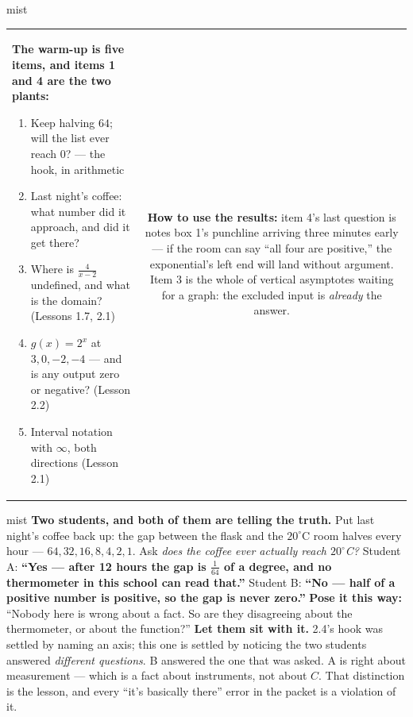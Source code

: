 \documentclass[10pt]{article}
\begin{document}
\begin{fixedskillbox}{mist}
\begin{tabularx}{\linewidth}{@{}X c@{}}
\begin{minipage}[t]{0.55\linewidth}\vspace{0pt}
\textbf{The warm-up is five items, and items 1 and 4 are the two plants:}
\begin{enumerate}[leftmargin=1.4em, itemsep=1pt, topsep=2pt]
  \item Keep halving $64$; will the list ever reach $0$? --- the hook, in arithmetic
  \item Last night's coffee: what number did it approach, and did it get there?
  \item Where is $\frac{4}{x-2}$ undefined, and what is the domain? (Lessons 1.7, 2.1)
  \item $g(x)=2^x$ at $3, 0, -2, -4$ --- and is any output zero or negative? (Lesson 2.2)
  \item Interval notation with $\infty$, both directions (Lesson 2.1)
\end{enumerate}
\end{minipage}
&
\begin{minipage}[t]{0.38\linewidth}\vspace{0pt}
\textbf{How to use the results:} item 4's last question is notes box 1's punchline arriving three
minutes early --- if the room can say ``all four are positive,'' the exponential's left end will land
without argument. Item 3 is the whole of vertical asymptotes waiting for a graph: the excluded input
is \emph{already} the answer.
\end{minipage}
\end{tabularx}
\end{fixedskillbox}

\begin{skillbox}[Hook]{mist}
\textbf{Two students, and both of them are telling the truth.} Put last night's coffee back up: the
gap between the flask and the $20^\circ$C room halves every hour --- $64, 32, 16, 8, 4, 2, 1$. Ask
\emph{does the coffee ever actually reach $20^\circ$C?} \quad Student A: \textbf{``Yes --- after 12
hours the gap is $\tfrac{1}{64}$ of a degree, and no thermometer in this school can read that.''}
Student B: \textbf{``No --- half of a positive number is positive, so the gap is never zero.''}
\textbf{Pose it this way:} ``Nobody here is wrong about a fact. So are they disagreeing about the
thermometer, or about the function?'' \textbf{Let them sit with it.} 2.4's hook was settled by naming
an axis; this one is settled by noticing the two students answered \emph{different questions}. B
answered the one that was asked. A is right about measurement --- which is a fact about instruments,
not about $C$. That distinction is the lesson, and every ``it's basically there'' error in the packet
is a violation of it.
\end{skillbox}
\end{document}
